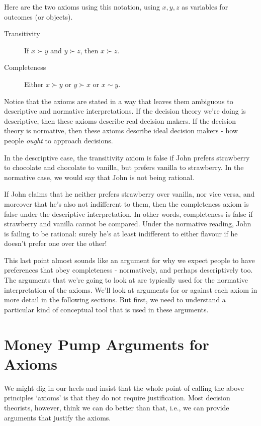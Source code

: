 \documentclass[]{tufte-book}
\begin{document}
Here are the two axioms using this notation, using \(x,y,z\) as variables for outcomes (or objects).

\begin{description}
\item[Transitivity]
If \(x\succ y\) and \(y\succ z\), then \(x\succ z\).
\item[Completeness]
Either \(x\succ y\) or \(y\succ x\) or \(x\sim y\).
\end{description}

Notice that the axioms are stated in a way that leaves them ambiguous to descriptive and normative interpretations. If the decision theory we're doing is descriptive, then these axioms describe real decision makers. If the decision theory is normative, then these axioms describe ideal decision makers - how people \emph{ought} to approach decisions.

In the descriptive case, the transitivity axiom is false if John prefers strawberry to chocolate and chocolate to vanilla, but prefers vanilla to strawberry. In the normative case, we would say that John is not being rational.

If John claims that he neither prefers strawberry over vanilla, nor vice versa, and moreover that he's also not indifferent to them, then the completeness axiom is false under the descriptive interpretation. In other words, completeness is false if strawberry and vanilla cannot be compared. Under the normative reading, John is failing to be rational: surely he's at least indifferent to either flavour if he doesn't prefer one over the other!

This last point almost sounds like an argument for why we expect people to have preferences that obey completeness - normatively, and perhaps descriptively too. The arguments that we're going to look at are typically used for the normative interpretation of the axioms. We'll look at arguments for or against each axiom in more detail in the following sections. But first, we need to understand a particular kind of conceptual tool that is used in these arguments.

\hypertarget{money-pump-arguments-for-axioms}{%
\section{Money Pump Arguments for Axioms}\label{money-pump-arguments-for-axioms}}

We might dig in our heels and insist that the whole point of calling the above principles `axioms' is that they do not require justification. Most decision theorists, however, think we can do better than that, i.e., we can provide arguments that justify the axioms.
\end{document}
